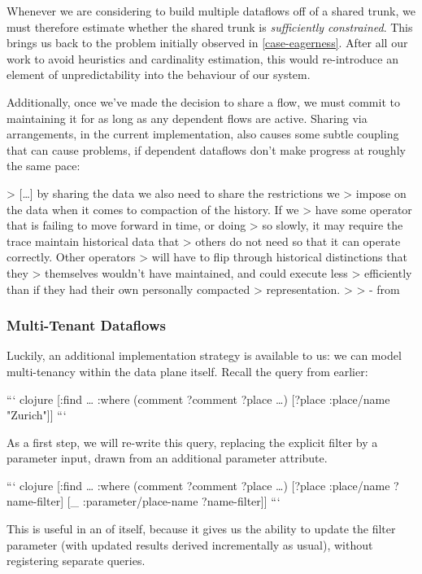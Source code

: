 \documentclass[../catalog.tex]{subfiles}
\begin{document}
Whenever we are considering to build multiple dataflows off of a
shared trunk, we must therefore estimate whether the shared trunk is
\emph{sufficiently constrained}. This brings us back to the problem
initially observed in \ref{case-eagerness}. After all our work to
avoid heuristics and cardinality estimation, this would re-introduce
an element of unpredictability into the behaviour of our system.

Additionally, once we've made the decision to share a flow, we must
commit to maintaining it for as long as any dependent flows are
active. Sharing via arrangements, in the current implementation, also
causes some subtle coupling that can cause problems, if dependent
dataflows don't make progress at roughly the same pace:

> [\ldots{}] by sharing the data we also need to share the restrictions we
> impose on the data when it comes to compaction of the history. If we
> have some operator that is failing to move forward in time, or doing
> so slowly, it may require the trace maintain historical data that
> others do not need so that it can operate correctly. Other operators
> will have to flip through historical distinctions that they
> themselves wouldn't have maintained, and could execute less
> efficiently than if they had their own personally compacted
> representation.
> 
> - from \cite{makingarrangements}

\subsubsection{Multi-Tenant Dataflows}

Luckily, an additional implementation strategy is available to us: we
can model multi-tenancy within the data plane itself. Recall the query
from earlier:

``` clojure
[:find \ldots{}
 :where
 (comment ?comment ?place \ldots{})
 [?place :place/name "Zurich"]]
```

As a first step, we will re-write this query, replacing the explicit
filter by a parameter input, drawn from an additional parameter
attribute.

``` clojure
[:find \ldots{}
 :where
 (comment ?comment ?place \ldots{})
 [?place :place/name ?name-filter]
 [\_ :parameter/place-name ?name-filter]]
```

This is useful in an of itself, because it gives us the ability to
update the filter parameter (with updated results derived
incrementally as usual), without registering separate queries.
\end{document}
